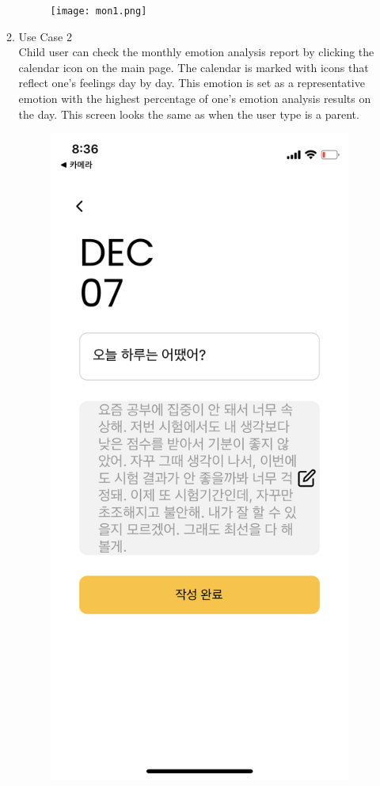 \documentclass[conference]{IEEEtran}
\begin{document}
\begin{enumerate}
\begin{enumerate}
\begin{figure}[H]
         \texttt{[image: mon1.png]}
         \end{figure}
        \item Use Case 2
        \\Child user can check the monthly emotion analysis report by clicking the calendar icon on the main page. The calendar is marked with icons that reflect one's feelings day by day. This emotion is set as a representative emotion with the highest percentage of one's emotion analysis results on the day. This screen looks the same as when the user type is a parent.
        \begin{figure}[H]
        \centering
        \includegraphics[scale=0.1]{UseCases/14.postA.png}

\end{figure}
\end{enumerate}
\end{enumerate}
\end{document}
